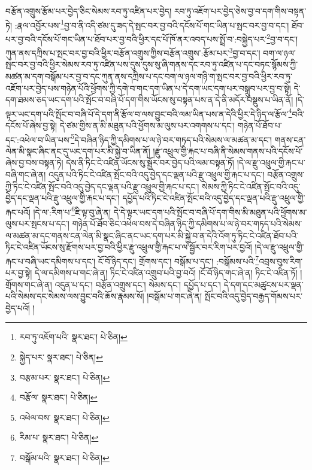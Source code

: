 བརྩོན་འགྲུས་རྩོམ་པར་བྱེད་ཅིང་སེམས་རབ་ཏུ་འཛིན་པར་བྱེད། རབ་ཏུ་འཇོག་པར་བྱེད་ཅེས་བྱ་བ་དག་གིས་བསྟན་ཏེ། :རྣལ་འབྱོར་པས་\footnote{རབ་ཏུ་འཇོག་པའི་  སྣར་ཐང་།  པེ་ཅིན། }བྱ་བ་ནི་འདི་ཙམ་དུ་ཟད་དེ་སྤང་བར་བྱ་བའི་དངོས་པོ་གང་ཡིན་པ་སྤང་བར་བྱ་བ་དང་། ཐོབ་པར་བྱ་བའི་དངོས་པོ་གང་ཡིན་པ་ཐོབ་པར་བྱ་བའི་ཕྱིར་དང་པོ་ཁོ་ནར་འབད་པས་སྤྲོ་བ་:བསྐྱེད་པར་\footnote{སྐྱེད་པར་  སྣར་ཐང་།  པེ་ཅིན། }བྱ་བ་དང་། ཀུན་ནས་དཀྲིས་པ་སྤང་བར་བྱ་བའི་ཕྱིར་བརྩོན་འགྲུས་ཀྱིས་བརྩོན་འགྲུས་:རྩོམ་པར་\footnote{བརྩམ་པར་  སྣར་ཐང་།  པེ་ཅིན། }བྱ་བ་དང་། བག་ལ་ཉལ་སྤང་བར་བྱ་བའི་ཕྱིར་སེམས་རབ་ཏུ་འཛིན་པས་དུས་དུས་སུ་ཞི་གནས་དང་རབ་ཏུ་འཛིན་པ་དང་བཏང་སྙོམས་ཀྱི་མཚན་མ་དག་བསྒོམ་པར་བྱ་བ་དང་ཀུན་ནས་དཀྲིས་པ་དང་བག་ལ་ཉལ་གཉི་ག་སྤང་བར་བྱ་བའི་ཕྱིར་རབ་ཏུ་འཇོག་པར་བྱེད་པས་གཉེན་པོའི་ཕྱོགས་ཀྱི་དགེ་བ་གང་དག་ཡིན་པ་དེ་དག་ཡང་དག་པར་བསྒྲུབ་པར་བྱ་བ་སྟེ། དེ་དག་ཐམས་ཅད་ཡང་དག་པའི་སྤོང་བ་བཞི་པོ་དག་གིས་ཡོངས་སུ་བསྟན་པས་ན་དེ་ནི་མདོར་བསྡུས་པ་ཡིན་ནོ། །དེ་ལྟར་ཡང་དག་པའི་སྤོང་བ་བཞི་པོ་དེ་དག་ནི་རྩོལ་བ་ལས་བྱུང་བའི་ལམ་ཡིན་པས་ན་དེའི་ཕྱིར་དེ་ཉིད་ལ་རྩོལ་\footnote{བརྩོལ་  སྣར་ཐང་།  པེ་ཅིན། }བའི་དངོས་པོ་ཞེས་བྱ་སྟེ། དེ་ཙམ་གྱིས་ན་མི་མཐུན་པའི་ཕྱོགས་མ་ལུས་པར་འགགས་པ་དང་། གཉེན་པོ་ཐོབ་པ་དང་:འཕེལ་བ་ཡིན་པས་\footnote{འཕེལ་བས་  སྣར་ཐང་།  པེ་ཅིན། }དེ་བཞིན་ཉིད་ཀྱི་དམིགས་པ་ལ་ཉེ་བར་གཏད་པའི་སེམས་ལ་མཚན་མ་དང་། གནས་ངན་ལེན་མི་སྣང་ཞིང་ནང་དུ་ཡང་དག་པར་མི་སྐྱེ་བ་ཡིན་ནོ། །རྫུ་འཕྲུལ་གྱི་རྐང་པ་བཞི་ནི་སེམས་གནས་པའི་དངོས་པོ་ཞེས་བྱ་བས་བསྟན་ཏེ། དེས་ནི་ཏིང་ངེ་འཛིན་ཡོངས་སུ་སྦྱོར་བར་བྱེད་པའི་ལམ་བསྟན་ཏོ། །དེ་ལ་རྫུ་འཕྲུལ་གྱི་རྐང་པ་བཞི་གང་ཞེ་ན། འདུན་པའི་ཏིང་ངེ་འཛིན་སྤོང་བའི་འདུ་བྱེད་དང་ལྡན་པའི་རྫུ་འཕྲུལ་གྱི་རྐང་པ་དང་། བརྩོན་འགྲུས་ཀྱི་ཏིང་ངེ་འཛིན་སྤོང་བའི་འདུ་བྱེད་དང་ལྡན་པའི་རྫུ་འཕྲུལ་གྱི་རྐང་པ་དང་། སེམས་ཀྱི་ཏིང་ངེ་འཛིན་སྤོང་བའི་འདུ་བྱེད་དང་ལྡན་པའི་རྫུ་འཕྲུལ་གྱི་རྐང་པ་དང་། དཔྱོད་པའི་ཏིང་ངེ་འཛིན་སྤོང་བའི་འདུ་བྱེད་དང་ལྡན་པའི་རྫུ་འཕྲུལ་གྱི་རྐང་པའོ། །དེ་ལ་:རིག་པ་\footnote{རིམ་པ་  སྣར་ཐང་།  པེ་ཅིན། }ཇི་ལྟ་བུ་ཞེ་ན། དེ་དེ་ལྟར་ཡང་དག་པའི་སྤོང་བ་བཞི་པོ་དག་གིས་མི་མཐུན་པའི་ཕྱོགས་མ་ལུས་པར་སྤངས་པ་དང་། གཉེན་པོ་ཐོབ་ཅིང་འཕེལ་བས་དེ་བཞིན་ཉིད་ཀྱི་དམིགས་པ་ལ་ཉེ་བར་གཏད་པའི་སེམས་ལ་མཚན་མ་དང་གནས་ངན་ལེན་མི་སྣང་ཞིང་ནང་ཡང་དག་པར་མི་སྐྱེ་བ་ན་དེའི་འོག་ཏུ་ཏིང་ངེ་འཛིན་ཐོབ་པའི་ཏིང་ངེ་འཛིན་ཡོངས་སུ་རྫོགས་པར་བྱ་བའི་ཕྱིར་རྫུ་འཕྲུལ་གྱི་རྐང་པ་ལ་སྦྱོར་བར་རིག་པར་བྱའོ། །དེ་ལ་རྫུ་འཕྲུལ་གྱི་རྐང་པ་བཞི་ཡང་དམིགས་པ་དང་། ངོ་བོ་ཉིད་དང་། གྲོགས་དང་། བསྒོམ་པ་དང་། :བསྒོམས་པའི་\footnote{བསྒོམ་པའི་  སྣར་ཐང་།  པེ་ཅིན། }འབྲས་བུས་རིག་པར་བྱ་སྟེ། དེ་ལ་དམིགས་པ་གང་ཞེ་ན། ཏིང་ངེ་འཛིན་འགྲུབ་པའི་བྱ་བའོ། །ངོ་བོ་ཉིད་གང་ཞེ་ན། ཏིང་ངེ་འཛིན་ཏོ། །གྲོགས་གང་ཞེ་ན། འདུན་པ་དང་། བརྩོན་འགྲུས་དང་། སེམས་དང་། དཔྱོད་པ་དང་། དེ་དག་དང་མཚུངས་པར་ལྡན་པའི་སེམས་དང་སེམས་ལས་བྱུང་བའི་ཆོས་རྣམས་སོ། །བསྒོམ་པ་གང་ཞེ་ན། སྤོང་བའི་འདུ་བྱེད་བརྒྱད་གོམས་པར་བྱེད་པའོ། །

